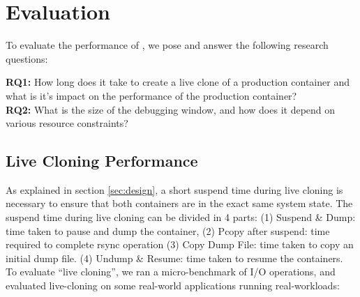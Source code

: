 \section{Evaluation}
\label{sec:evaluation}

To evaluate the performance of \parikshan, we pose and answer the following research questions:

\noindent \textbf{RQ1:} How long does it take to create a live clone of a production container and what is it's impact on the performance of the production container?\\
\noindent \textbf{RQ2:} What is the size of the debugging window, and how does it depend on various resource constraints? 

\subsection{Live Cloning Performance}
\label{sec:performance}

As explained in section \ref{sec:design}, a short suspend time during live cloning is necessary to ensure that both containers are in the exact same system state.
The suspend time during live cloning can be divided in 4 parts: 
(1) Suspend \& Dump: time taken to pause and dump the container, 
(2) Pcopy after suspend: time required to complete rsync operation 
(3) Copy Dump File: time taken to copy an initial dump file.
(4) Undump \& Resume: time taken to resume the containers. 
To evaluate ``live cloning'', we ran a micro-benchmark of I/O operations, and evaluated live-cloning on some real-world applications running real-workloads:




